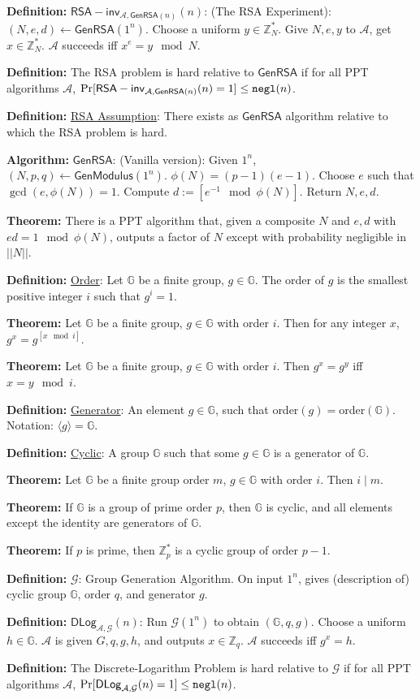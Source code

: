 \documentclass[10pt]{article}
\newcommand{\Z}{\mathbb{Z}}
\newcommand{\G}{\mathbb{G}}
\newcommand{\AAA}{\mathcal{A}}
\newcommand{\GGG}{\mathcal{G}}
\newcommand{\defn}[1]{{\bf Definition:} \underline{#1}}
\newcommand{\thm}[1]{{\bf Theorem:} \underline{#1}}
\newcommand{\alg}[1]{{\bf Algorithm:} \underline{#1}}
\newcommand{\GenM}{\mathsf{GenModulus}}
\newcommand{\GenRSA}{\mathsf{GenRSA}}
\newcommand{\ang}[1]{\langle#1\rangle}
\newcommand{\ExptDLogArgs}[2]{\mathsf{DLog}_{#1,#2}}
\newcommand{\ExptRSAArgs}[2]{\mathsf{RSA-inv}_{#1,#2}}
\newcommand{\ExptDLog}{\ExptDLogArgs{\AAA}{\GGG}}
\newcommand{\ExptRSA}{\ExptRSAArgs{\AAA}{\GenRSA(n)}}
\newcommand{\negl}{{\tt negl}}
\newcommand{\from}{\leftarrow}
\begin{document}
\begin{multicols}{4}
\defn{$\ExptRSA(n)$}: (The RSA Experiment): $(N,e,d)\from\GenRSA(1^n)$. Choose a uniform $y\in\Z^*_N$. Give $N,e,y$ to $\AAA$, get $x\in\Z^*_N$. $\AAA$ succeeds iff $x^e=y\mod{N}$.

\defn{}The RSA problem is hard relative to $\GenRSA$ if for all PPT algorithms $\AAA$, $\Pr[\ExptRSA(n)=1]\leq\negl(n)$.

\defn{RSA Assumption}: There exists as $\GenRSA$ algorithm relative to which the RSA problem is hard.

\alg{$\GenRSA$}: (Vanilla version): Given $1^n$, $(N,p,q)\from\GenM(1^n)$. $\phi(N)=(p-1)(e-1)$. Choose $e$ such that $\gcd(e,\phi(N))=1$. Compute $d:=[e^{-1}\mod{\phi(N)}]$. Return $N,e,d$.

\thm{}There is a PPT algorithm that, given a composite $N$ and $e,d$ with $ed=1\mod{\phi(N)}$, outputs a factor of $N$ except with probability negligible in $||N||$.

\defn{Order}: Let $\G$ be a finite group, $g\in\G$. The order of $g$ is the smallest positive integer $i$ such that $g^i=1$.

\thm{}Let $\G$ be a finite group, $g\in\G$ with order $i$. Then for any integer $x$, $g^x=g^{[x\mod{i}]}$.

\thm{}Let $\G$ be a finite group, $g\in\G$ with order $i$. Then $g^x=g^y$ iff $x=y\mod{i}$.

\defn{Generator}: An element $g\in\G$, such that order$(g)=$order$(\G)$. Notation: $\ang{g}=\G$.

\defn{Cyclic}: A group $\G$ such that some $g\in\G$ is a generator of $\G$.

\thm{}Let $\G$ be a finite group order $m$, $g\in\G$ with order $i$. Then $i\mid m$.

\thm{}If $\G$ is a group of prime order $p$, then $\G$ is cyclic, and all elements except the identity are generators of $\G$.

\thm{}If $p$ is prime, then $\Z_p^*$ is a cyclic group of order $p-1$.

\defn{$\GGG$}: Group Generation Algorithm. On input $1^n$, gives (description of) cyclic group $\G$, order $q$, and generator $g$.

\defn{$\ExptDLog(n)$}: Run $\GGG(1^n)$ to obtain $(\G,q,g)$. Choose a uniform $h\in\G$. $\AAA$ is given $G,q,g,h$, and outputs $x\in\Z_q$. $\AAA$ succeeds iff $g^x=h$.

\defn{}The Discrete-Logarithm Problem is hard relative to $\GGG$ if for all PPT algorithms $\AAA$, $\Pr[\ExptDLog(n)=1]\leq\negl(n)$.


\end{multicols}
\end{document}
